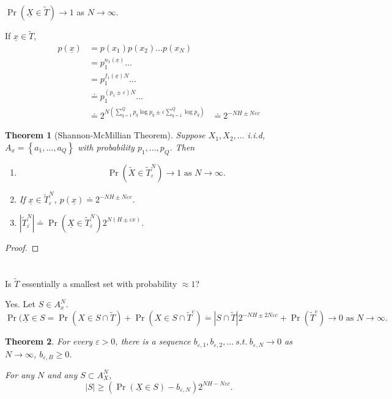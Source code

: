 \documentclass{report}
\newcommand{\st}{\ s.t.\ }
\newcommand{\set}[1]{\left\lbrace #1 \right\rbrace}
\newtheorem{theorem}{Theorem}[section]
\theoremstyle{definition}
\theoremstyle{remark}
\numberwithin{equation}{section}
\begin{document}
$\Pr(\underline{X} \in \tilde{T}) \to 1$ as $N \to \infty$.

If $\underline{x} \in \tilde{T}$, \begin{align*}
  p(\underline{x}) & = p(x_1)p(x_2)\ldots p(x_N) \\
  & = p_1^{n_1(\underline{x})}\ldots \\
  & = p_1^{f_1(\underline{x})N}\ldots \\
  & \doteq p_1^{(p_1 \pm \varepsilon)N}\ldots \\
  & \doteq 2^{N\left(\sum_{q=1}^Q p_q\log p_q \pm \varepsilon \sum_{q=1}^Q\log p_q\right)}
  & \doteq 2^{-NH \pm N\varepsilon c}
\end{align*}

\begin{theorem}[Shannon-McMillian Theorem]
  Suppose $X_1, X_2, \ldots$ i.i.d, $A_x = \set{a_1, \ldots, a_Q}$ with probability $p_1, \ldots, p_Q$. Then \begin{enumerate}
    \item  \[ \Pr(\tilde{X} \in \tilde{T}_\varepsilon^N) \to 1 \text{ as } N \to \infty. \]
    \item If $\underline{x} \in \tilde{T}_\varepsilon^N$, $p(\underline{x}) \doteq 2^{-NH \pm N\varepsilon c}$.
    \item $\left|\tilde{T}_\varepsilon^N\right| \doteq \Pr(\underline{X} \in \tilde{T}_\varepsilon^N)2^{N(H \pm \varepsilon x)}$.
  \end{enumerate}
\end{theorem}
\begin{proof}
\end{proof}

\section{}

Is $\tilde{T}$ essentially a smallest set with probability $\approx 1$?

Yes. Let $S \in A_x^N$. \[
  \Pr(\underline{X} \in S = \Pr(X \in S \cap \tilde{T}) + \Pr(X \in S \cap \tilde{T}^c) \ddot{=} |S \cap \tilde{T}|2^{-NH \pm 2N\varepsilon c} + \Pr(\tilde{T}^c) \to 0 \text{ as } N \to \infty.  
\]

\begin{theorem}
  For every $\varepsilon > 0$, there is a sequence $b_{\varepsilon,1}, b_{\varepsilon,2}, \ldots \st b_{\varepsilon, N} \to 0$ as $N \to \infty$, $b_{\varepsilon, B} \geq 0$.

  For any $N$ and any $S \subset A_X^N$, \[
    |S| \geq \left(\Pr(\underline{X}\in S) - b_{\varepsilon, N}\right)2^{NH - N\varepsilon c}.  
  \]
\end{theorem}
\end{document}
